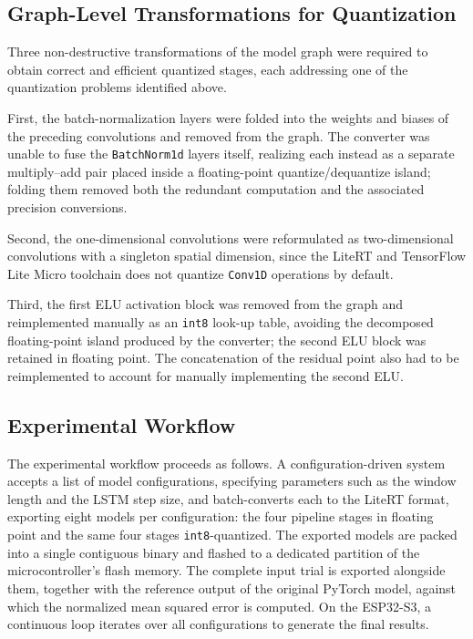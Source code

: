 \documentclass[12pt,DIV16,BCOR12mm,a4paper,footinclude=false,headinclude,parskip=half-,twoside,openright,cleardoublepage=empty,toc=index,bibliography=totoc,listof=totoc]{scrreprt}
\numberwithin{equation}{chapter}
\begin{document}
  \subsection{Graph-Level Transformations for Quantization}
  \label{sec:graph_mod}
  Three non-destructive transformations of the model graph were required to obtain correct
  and efficient quantized stages, each addressing one of the quantization problems
  identified above.

  First, the batch-normalization layers were folded into the weights and
  biases of the preceding convolutions and removed from the graph. The converter was unable
  to fuse the \texttt{BatchNorm1d} layers itself, realizing each instead as a separate
  multiply--add pair placed inside a floating-point quantize/dequantize island; folding them
  removed both the redundant computation and the associated precision conversions.

  Second, the one-dimensional convolutions were reformulated as two-dimensional convolutions
  with a singleton spatial dimension, since the LiteRT and TensorFlow Lite Micro toolchain
  does not quantize \texttt{Conv1D} operations by default.

  Third, the first ELU activation block was removed from the graph and reimplemented
  manually as an \texttt{int8} look-up table, avoiding the decomposed floating-point island
  produced by the converter; the second ELU block was retained in floating point. 
  The concatenation of the residual point also had to be reimplemented to account
  for manually implementing the second ELU.

  \subsection{Experimental Workflow}

  The experimental workflow proceeds as follows. A configuration-driven system accepts a
  list of model configurations, specifying parameters such as the window length and the LSTM
  step size, and batch-converts each to the LiteRT format, exporting eight models per
  configuration: the four pipeline stages in floating point and the same four stages
  \texttt{int8}-quantized. The exported models are packed into a single contiguous binary
  and flashed to a dedicated partition of the microcontroller's flash memory. The complete
  input trial is exported alongside them, together with the reference output of the original
  PyTorch model, against which the normalized mean squared error is computed. On the
  ESP32-S3, a continuous loop iterates over all configurations to generate the final results.
\end{document}
